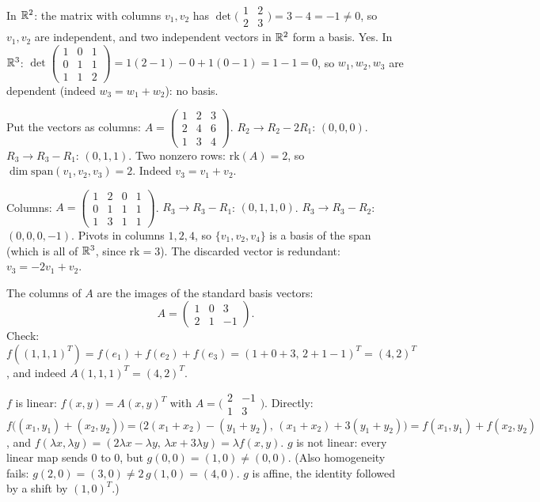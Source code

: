 \begin{solutions}
    \item In $\mathbb{R}^{2}$: the matrix with columns $v_{1}, v_{2}$ has $\det\bigl(\begin{smallmatrix} 1 & 2 \\ 2 & 3 \end{smallmatrix}\bigr) = 3 - 4 = -1 \neq 0$, so $v_{1}, v_{2}$ are independent, and two independent vectors in $\mathbb{R}^{2}$ form a basis. Yes. In $\mathbb{R}^{3}$: $\det\begin{pmatrix} 1 & 0 & 1 \\ 0 & 1 & 1 \\ 1 & 1 & 2 \end{pmatrix} = 1(2 - 1) - 0 + 1(0 - 1) = 1 - 1 = 0$, so $w_{1}, w_{2}, w_{3}$ are dependent (indeed $w_{3} = w_{1} + w_{2}$): no basis.

    \item Put the vectors as columns: $A = \begin{pmatrix} 1 & 2 & 3 \\ 2 & 4 & 6 \\ 1 & 3 & 4 \end{pmatrix}$. $R_{2} \to R_{2} - 2 R_{1}$: $(0, 0, 0)$. $R_{3} \to R_{3} - R_{1}$: $(0, 1, 1)$. Two nonzero rows: $\mathrm{rk}(A) = 2$, so $\dim \mathrm{span}(v_{1}, v_{2}, v_{3}) = 2$. Indeed $v_{3} = v_{1} + v_{2}$.

    \item Columns: $A = \begin{pmatrix} 1 & 2 & 0 & 1 \\ 0 & 1 & 1 & 1 \\ 1 & 3 & 1 & 1 \end{pmatrix}$. $R_{3} \to R_{3} - R_{1}$: $(0, 1, 1, 0)$. $R_{3} \to R_{3} - R_{2}$: $(0, 0, 0, -1)$. Pivots in columns $1, 2, 4$, so $\{v_{1}, v_{2}, v_{4}\}$ is a basis of the span (which is all of $\mathbb{R}^{3}$, since $\mathrm{rk} = 3$). The discarded vector is redundant: $v_{3} = -2 v_{1} + v_{2}$.

    \item The columns of $A$ are the images of the standard basis vectors:
    \[
    A = \begin{pmatrix} 1 & 0 & 3 \\ 2 & 1 & -1 \end{pmatrix}.
    \]
    Check: $f((1, 1, 1)^{T}) = f(e_{1}) + f(e_{2}) + f(e_{3}) = (1 + 0 + 3, \, 2 + 1 - 1)^{T} = (4, 2)^{T}$, and indeed $A (1, 1, 1)^{T} = (4, 2)^{T}$.

    \item $f$ is linear: $f(x, y) = A (x, y)^{T}$ with $A = \bigl(\begin{smallmatrix} 2 & -1 \\ 1 & 3 \end{smallmatrix}\bigr)$. Directly: $f\bigl((x_{1}, y_{1}) + (x_{2}, y_{2})\bigr) = \bigl(2(x_{1} + x_{2}) - (y_{1} + y_{2}), \, (x_{1} + x_{2}) + 3(y_{1} + y_{2})\bigr) = f(x_{1}, y_{1}) + f(x_{2}, y_{2})$, and $f(\lambda x, \lambda y) = (2 \lambda x - \lambda y, \, \lambda x + 3 \lambda y) = \lambda f(x, y)$. $g$ is not linear: every linear map sends $0$ to $0$, but $g(0, 0) = (1, 0) \neq (0, 0)$. (Also homogeneity fails: $g(2, 0) = (3, 0) \neq 2\, g(1, 0) = (4, 0)$. $g$ is affine, the identity followed by a shift by $(1, 0)^{T}$.)


\end{solutions}
